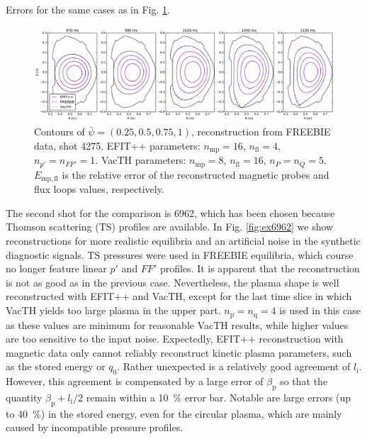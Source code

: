 \begin{table}
\caption{Errors for the same cases as in Fig. \ref{fig:ex4275}.}
\label{table:ex4275}
\end{table}

\begin{figure}
\centering   %
\hfill{}
\includegraphics[width=18cm]{figures/example_4275.pdf}
\hfill{}
\caption{Contours of $\bar\psi=\left(0.25,0.5,0.75,1\right)$, reconstruction from FREEBIE data, shot 4275. EFIT++ parameters: $n_\mathrm{mp} = 16$, $n_\mathrm{fl} = 4$, $n_{p'} = n_{FF'} = 1$. VacTH parameters: $n_\mathrm{mp} = 8$, $n_\mathrm{fl} = 16$, $n_P = n_Q = 5$. $E_\mathrm{mp, fl}$ is the relative error of the reconstructed magnetic probes and flux loops values, respectively.}
\label{fig:ex4275}
\end{figure}


The second shot for the comparison is 6962, which has been chosen because Thomson scattering (TS) profiles are available. In Fig. \ref{fig:ex6962} we show reconstructions for more realistic equilibria and an artificial noise in the synthetic diagnostic signals. TS pressures were used in FREEBIE equilibria, which course no longer feature linear $p'$ and $FF'$ profiles. 
It is apparent that the reconstruction is not as good as in the previous case. Nevertheless, the plasma shape is well reconstructed with EFIT++ and VacTH, except for the last time slice in which VacTH yields too large plasma in the upper part.
$n_{\mathrm p} = n_{\mathrm q} = 4$ is used in this case as these values are minimum for reasonable VacTH results, while higher values are too sensitive to the input noise.
Expectedly, EFIT++ reconstruction with magnetic data only cannot reliably reconstruct kinetic plasma parameters, such as the stored energy or $q_0$. Rather unexpected is a relatively good agreement of $l_\mathrm{i}$. However, this agreement is compensated by a large error of $\beta_{\mathrm p}$ so that the quantity $\beta_{\mathrm p} + l_{\mathrm i}/2$ remain within a 10~\% error bar. Notable are large errors (up to 40~\%) in the stored energy, even for the circular plasma, which are mainly caused by incompatible pressure profiles.

